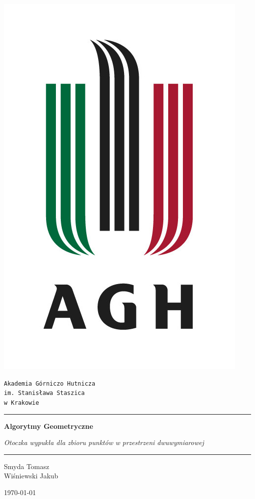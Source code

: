 \documentclass[a4paper,11pt]{article}
\begin{document}
\begin{titlepage}
\scshape

\centering
\includegraphics[scale=0.8]{logo.jpg} \par \vspace{0.1cm}
\huge \texttt{Akademia Górniczo Hutnicza \\ im. Stanisława Staszica \\ w Krakowie}
\vspace{1cm}


\rule{\textwidth}{2px}
{\Huge{\textbf{Algorytmy Geometryczne }}}\par \vspace{0.4cm}
\huge{ \textit{Otoczka wypukła dla zbioru punktów w przestrzeni dwuwymiarowej}}
\rule{\textwidth}{2px}

\vspace{1cm}

\begin{center}
Smyda Tomasz \\
\vspace{0.3 cm}
Wiśniewski Jakub
\end{center}
\vfill
\today

\end{titlepage}
\end{document}
